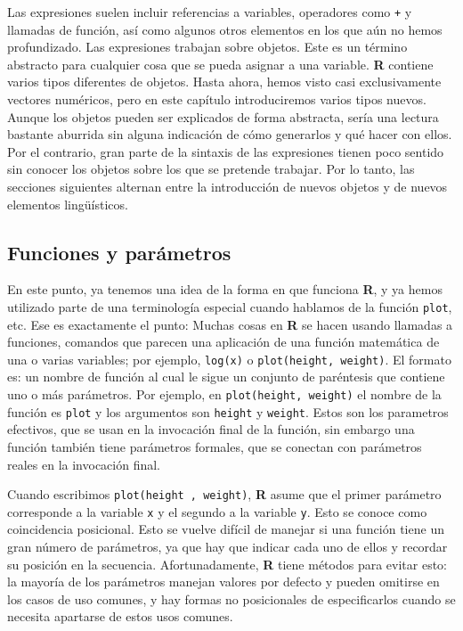 \documentclass[spanish]{extbook}
\numberwithin{equation}{section}
\numberwithin{figure}{section}
\begin{document}
Las expresiones suelen incluir referencias a variables, operadores como
\texttt{+} y llamadas de función, así como algunos otros elementos en los que
aún no hemos profundizado.  Las expresiones trabajan sobre objetos. Este es un
término abstracto para cualquier cosa que se pueda asignar a una variable.
\textbf{R} contiene varios tipos diferentes de objetos. Hasta ahora, hemos
visto casi exclusivamente vectores numéricos, pero en este capítulo
introduciremos varios tipos nuevos.  Aunque los objetos pueden ser explicados
de forma abstracta, sería una lectura bastante aburrida sin alguna indicación
de cómo generarlos y qué hacer con ellos. Por el contrario, gran parte de la
sintaxis de las expresiones tienen poco sentido sin conocer los objetos sobre
los que se pretende trabajar. Por lo tanto, las secciones siguientes alternan
entre la introducción de nuevos objetos y de nuevos elementos lingüísticos.

\subsection{Funciones y parámetros}

En este punto, ya tenemos una idea de la forma en que funciona \textbf{R}, y ya
hemos utilizado parte de una terminología especial cuando hablamos de la
función \texttt{plot}, etc. Ese es exactamente el punto: Muchas cosas en
\textbf{R} se hacen usando llamadas a funciones, comandos que parecen una
aplicación de una función matemática de una o varias variables; por ejemplo,
\texttt{log(x)} o \texttt{plot(height, weight)}. El formato es: un nombre de
función al cual le sigue un conjunto de paréntesis que contiene uno o más
parámetros. Por ejemplo, en \texttt{plot(height, weight)} el nombre de la
función es \texttt{plot} y los argumentos son \texttt{height} y
\texttt{weight}.  Estos son los parametros efectivos, que se usan en la
invocación final de la función, sin embargo una función también tiene
parámetros formales, que se conectan con parámetros reales en la invocación
final.

Cuando escribimos \texttt{plot(height , weight)}, \textbf{R} asume que el
primer parámetro corresponde a la variable \texttt{x} y el segundo a la
variable \texttt{y}. Esto se conoce como coincidencia posicional. Esto se
vuelve difícil de manejar si una función tiene un gran número de parámetros, ya
que hay que indicar cada uno de ellos y recordar su posición en la secuencia.
Afortunadamente, \textbf{R} tiene métodos para evitar esto: la mayoría de los
parámetros manejan valores por defecto y pueden omitirse en los casos de uso
comunes, y hay formas no posicionales de especificarlos cuando se necesita
apartarse de estos usos comunes.
\end{document}
